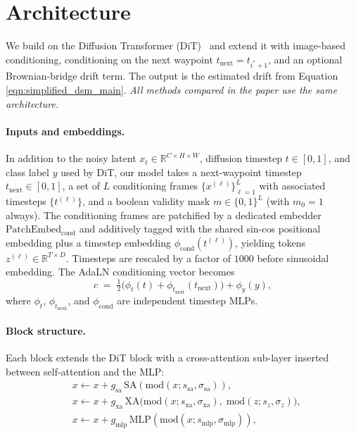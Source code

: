 \section{Architecture}
\label{sec:architecture}

We build on the Diffusion Transformer (DiT)~\cite{peebles2023scalable} and extend it with image-based conditioning, conditioning on the next waypoint $t_\text{next} = t_{i^*+1}$, and an optional Brownian-bridge drift term. The output is the estimated drift from Equation \ref{eqn:simplified_dsm_main}. \textit{All methods compared in the paper use the same architecture.}

\paragraph{Inputs and embeddings.} In addition to the noisy latent $x_t \in \mathbb{R}^{C \times H \times W}$, diffusion timestep $t \in [0,1]$, and class label $y$ used by DiT, our model takes a next-waypoint timestep $t_{\text{next}} \in [0,1]$, a set of $L$ conditioning frames $\{x^{(\ell)}\}_{\ell=1}^{L}$ with associated timesteps $\{t^{(\ell)}\}$, and a boolean validity mask $m \in \{0,1\}^{L}$ (with $m_0 = 1$ always). The conditioning frames are patchified by a dedicated embedder $\mathrm{PatchEmbed}_{\text{cond}}$ and additively tagged with the shared sin-cos positional embedding plus a timestep embedding $\phi_{\text{cond}}(t^{(\ell)})$, yielding tokens $z^{(\ell)} \in \mathbb{R}^{T \times D}$. Timesteps are rescaled by a factor of $1000$ before sinusoidal embedding. The AdaLN conditioning vector becomes
\[
c \;=\; \tfrac{1}{2}\bigl(\phi_t(t) + \phi_{t_{\text{next}}}(t_{\text{next}})\bigr) + \phi_y(y),
\]
where $\phi_t$, $\phi_{t_{\text{next}}}$, and $\phi_{\text{cond}}$ are independent timestep MLPs. %

\paragraph{Block structure.} Each block extends the DiT block with a cross-attention sub-layer inserted between self-attention and the MLP:
\begin{align}
&x \leftarrow x + g_{\text{sa}}\,\mathrm{SA}(\mathrm{mod}(x; s_{\text{sa}}, \sigma_{\text{sa}})), \\
&x \leftarrow x + g_{\text{xa}}\,\mathrm{XA}\bigl(\mathrm{mod}(x; s_{\text{xa}}, \sigma_{\text{xa}}),\; \mathrm{mod}(z; s_z, \sigma_z)\bigr), \\
&x \leftarrow x + g_{\text{mlp}}\,\mathrm{MLP}(\mathrm{mod}(x; s_{\text{mlp}}, \sigma_{\text{mlp}})),
\end{align}


